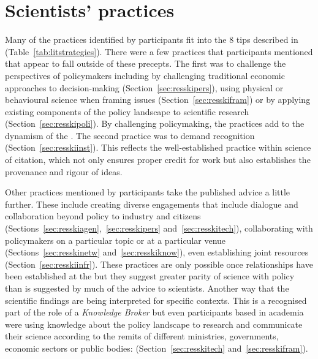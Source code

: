 \section{Scientists' practices}\label{sec:disstrategies}

Many of the practices identified by participants fit into the 8 tips described in \textcite{OliverC2019} (Table~\ref{tab:litstrategies}). There were a few practices that participants mentioned that appear to fall outside of these precepts. The first was to challenge the perspectives of policymakers including by challenging traditional economic approaches to decision-making (Section~\ref{sec:resskipers}), using physical or behavioural science when framing issues (Section~\ref{sec:resskifram}) or by applying existing components of the policy landscape to scientific research (Section~\ref{sec:resskipoli}). By challenging policymaking, the practices add to the dynamism of the \SPI. The second practice was to demand recognition (Section~\ref{sec:resskiinst}). This reflects the well-established practice within science of citation, which not only ensures proper credit for work but also establishes the provenance and rigour of ideas.

Other practices mentioned by participants take the published advice a little further. These include creating diverse engagements that include dialogue and collaboration beyond policy to industry and citizens (Sections~\ref{sec:resskiagen},~\ref{sec:resskipers} and~\ref{sec:resskitech}), collaborating with policymakers on a particular topic or at a particular venue (Sections~\ref{sec:resskinetw} and~\ref{sec:resskiknow}), even establishing joint resources (Section~\ref{sec:resskiinfr}). These practices are only possible once relationships have been established at the \SPI{} but they suggest greater parity of science with policy than is suggested by much of the advice to scientists. Another way that the scientific findings are being interpreted for specific contexts. This is a recognised part of the role of a \emph{Knowledge Broker} but even participants based in academia were using knowledge about the policy landscape to research and communicate their science according to the remits of different ministries, governments, economic sectors or public bodies:  (Section~\ref{sec:resskitech} and~\ref{sec:resskifram}).

